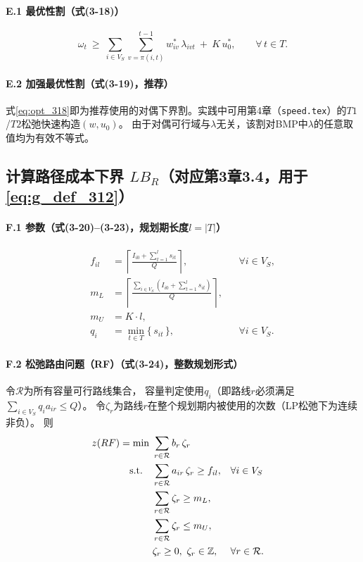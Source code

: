\documentclass{article}
\begin{document}
\paragraph{E.1 最优性割（式(3-18)）}
\begin{equation}
\omega_t\ \ge\ \sum_{i\in V_S}\sum_{v=\pi(i,t)}^{t-1} w_{iv}^*\,\lambda_{ivt}\ +\ K\,u_0^*,
\qquad \forall\, t\in T.
\label{eq:opt_318}
\end{equation}

\paragraph{E.2 加强最优性割（式(3-19)，推荐）}
式\eqref{eq:opt_318}即为推荐使用的对偶下界割。实践中可用第4章（\texttt{speed.tex}）的$T1$/$T2$松弛快速构造$(w,u_0)$。
由于对偶可行域与$\lambda$无关，该割对BMP中$\lambda$的任意取值均为有效不等式。

\subsection{计算路径成本下界 $LB_R$（对应第3章3.4，用于\eqref{eq:g_def_312}）}

\paragraph{F.1 参数（式(3-20)--(3-23)，规划期长度$l=|T|$）}
\begin{align}
f_{il} &= \left\lceil \frac{I_{i0}+\sum_{t=1}^{l}s_{it}}{Q}\right\rceil, && \forall i\in V_S, \label{eq:param_320}\\
m_L &= \left\lceil \frac{\sum_{i\in V_S}\left(I_{i0}+\sum_{t=1}^{l}s_{it}\right)}{Q}\right\rceil, \label{eq:param_321}\\
m_U &= K\cdot l, \label{eq:param_322}\\
q_i &= \min_{t\in T}\{\,s_{it}\,\}, && \forall i\in V_S. \label{eq:param_323}
\end{align}

\paragraph{F.2 松弛路由问题（RF）（式(3-24)，整数规划形式）}
令$\mathcal R$为所有容量可行路线集合，
容量判定使用$q_i$（即路线$r$必须满足$\sum_{i\in V_S} q_i a_{ir}\le Q$）。
令$\zeta_r$为路线$r$在整个规划期内被使用的次数（LP松弛下为连续非负）。
则
\begin{align}
z(RF)=\min\ & \sum_{r\in\mathcal R} b_r\,\zeta_r \notag\\
\text{s.t.}\quad
& \sum_{r\in\mathcal R} a_{ir}\,\zeta_r \ge f_{il}, && \forall i\in V_S \notag\\
& \sum_{r\in\mathcal R} \zeta_r \ge m_L, \notag\\
& \sum_{r\in\mathcal R} \zeta_r \le m_U, \notag\\
& \zeta_r \ge 0,\ \zeta_r\in\mathbb Z, && \forall r\in\mathcal R .
\label{eq:rf_324}
\end{align}
\end{document}
